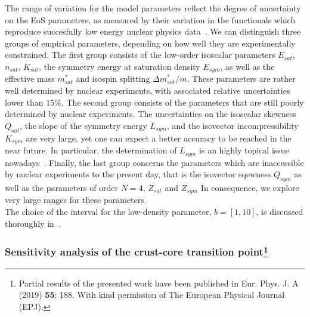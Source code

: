 The range of variation for the model parameters reflect the degree of 
uncertainty on the EoS parameters, as measured by their variation in the 
functionals which reproduce succesfully low energy nuclear physics
data~\cite{Margueron2018a}. We can distinguish three groups of empirical  
parameters, depending on how well they are experimentally constrained. The 
first group consists of the low-order isoscalar parameters $E_{sat}$, 
$n_{sat}$, $K_{sat}$, the symmetry energy at saturation density $E_{sym}$, as 
well as the effective mass $m_{sat}^*$ and isospin splitting 
$\Delta m_{sat}^*/m$. These parameters are rather well determined by nuclear 
experiments, with associated relative uncertainties lower than $15\%$. The 
second group consists of the parameters that are still poorly determined by 
nuclear experiments. The uncertainties on the isoscalar skewness $Q_{sat}$, the 
slope of the symmetry energy $L_{sym}$, and the isovector incompressibility 
$K_{sym}$ are very large, yet one can expect a better accuracy to be 
reached in the near future. In particular, the determination of $L_{sym}$ is 
an highly topical issue nowadays~\cite{Li2014}. Finally, the last group 
concerns the parameters which are inaccessible by nuclear experiments to the 
present day, that is the isovector sqewness $Q_{sym}$ as well as the parameters 
of order $N=4$, $Z_{sat}$ and $Z_{sym}$ In consequence, we explore very large 
ranges for these parameters.\\
The choice of the interval for the low-density parameter, $b = [1,10]$, is 
discussed thoroughly in~\cite{Antic2019}.

\subsubsection{Sensitivity analysis of the crust-core transition
point\footnote{Partial results of the presented work have been published in 
Eur. Phys. J. A (2019) \textbf{55}: 188. With kind permission of The European
Physical Journal (EPJ).}}

